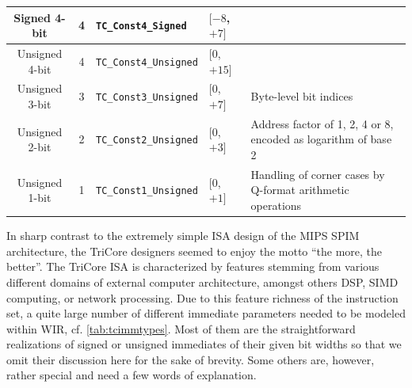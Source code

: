 \begin{table}[t]
\begin{center}
\begin{tabular}{|c|c|l|l|p{52mm}|}
      \hline
      Signed 4-bit & 4 & \texttt{TC\_Const4\_Signed} & $[-8$, $+7]$ & \\
      \hline
      Unsigned 4-bit & 4 & \texttt{TC\_Const4\_Unsigned} & $[0$, $+15]$ & \\
      \hline
      Unsigned 3-bit & 3 & \texttt{TC\_Const3\_Unsigned} & $[0$, $+7]$ & Byte-level bit indices \\
      \hline
      Unsigned 2-bit & 2 & \texttt{TC\_Const2\_Unsigned} & $[0$, $+3]$ & Address factor of 1, 2, 4 or 8, encoded as logarithm of base 2 \\
      \hline
      Unsigned 1-bit & 1 & \texttt{TC\_Const1\_Unsigned} & $[0$, $+1]$ & Handling of corner cases by Q-format arithmetic operations \\
      \hline
    \end{tabular}
  \end{center}
\end{table}

In sharp contrast to the extremely simple \gls{ISA} design of the MIPS SPIM architecture, the TriCore designers seemed to enjoy the motto ``the more, the better''.
The TriCore \gls{ISA} is characterized by features stemming from various different domains of external computer architecture, amongst others \gls{DSP}, \gls{SIMD} computing, or network processing.
Due to this feature richness of the instruction set, a quite large number of different immediate parameters needed to be modeled within \gls{WIR}, cf. \cref{tab:tcimmtypes}.
Most of them are the straightforward realizations of signed or unsigned immediates of their given bit widths so that we omit their discussion here for the sake of brevity.
Some others are, however, rather special and need a few words of explanation.

